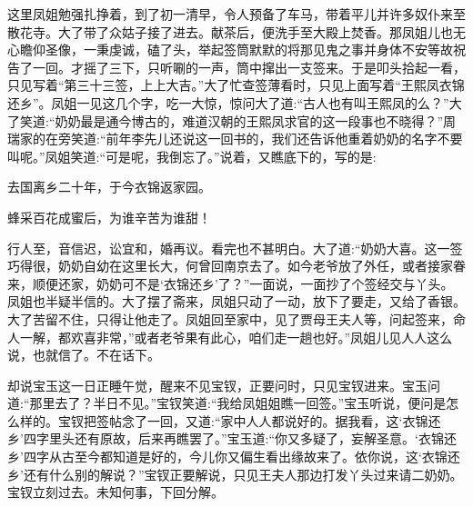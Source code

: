 \begin{parag}
    这里凤姐勉强扎挣着，到了初一清早，令人预备了车马，带着平儿并许多奴仆来至散花寺。大了带了众姑子接了进去。献茶后，便洗手至大殿上焚香。那凤姐儿也无心瞻仰圣像，一秉虔诚，磕了头，举起签筒默默的将那见鬼之事并身体不安等故祝告了一回。才摇了三下，只听唰的一声，筒中撺出一支签来。于是叩头拾起一看，只见写着“第三十三签，上上大吉。”大了忙查签薄看时，只见上面写着“王熙凤衣锦还乡”。凤姐一见这几个字，吃一大惊，惊问大了道:“古人也有叫王熙凤的么？”大了笑道:“奶奶最是通今博古的，难道汉朝的王熙凤求官的这一段事也不晓得？”周瑞家的在旁笑道:“前年李先儿还说这一回书的，我们还告诉他重着奶奶的名字不要叫呢。”凤姐笑道:“可是呢，我倒忘了。”说着，又瞧底下的，写的是:
\end{parag}


\begin{poem}
    \begin{pl}
        去国离乡二十年，于今衣锦返家园。
    \end{pl}


    \begin{pl}
        蜂采百花成蜜后，为谁辛苦为谁甜！
    \end{pl}

\end{poem}


\begin{parag}
    行人至，音信迟，讼宜和，婚再议。看完也不甚明白。大了道:“奶奶大喜。这一签巧得很，奶奶自幼在这里长大，何曾回南京去了。如今老爷放了外任，或者接家眷来，顺便还家，奶奶可不是‘衣锦还乡’了？”一面说，一面抄了个签经交与丫头。凤姐也半疑半信的。大了摆了斋来，凤姐只动了一动，放下了要走，又给了香银。大了苦留不住，只得让他走了。凤姐回至家中，见了贾母王夫人等，问起签来，命人一解，都欢喜非常，”或者老爷果有此心，咱们走一趟也好。”凤姐儿见人人这么说，也就信了。不在话下。
\end{parag}


\begin{parag}
    却说宝玉这一日正睡午觉，醒来不见宝钗，正要问时，只见宝钗进来。宝玉问道:“那里去了？半日不见。”宝钗笑道:“我给凤姐姐瞧一回签。”宝玉听说，便问是怎么样的。宝钗把签帖念了一回，又道:“家中人人都说好的。据我看，这‘衣锦还乡’四字里头还有原故，后来再瞧罢了。”宝玉道:“你又多疑了，妄解圣意。‘衣锦还乡’四字从古至今都知道是好的，今儿你又偏生看出缘故来了。依你说，这‘衣锦还乡’还有什么别的解说？”宝钗正要解说，只见王夫人那边打发丫头过来请二奶奶。宝钗立刻过去。未知何事，下回分解。
\end{parag}